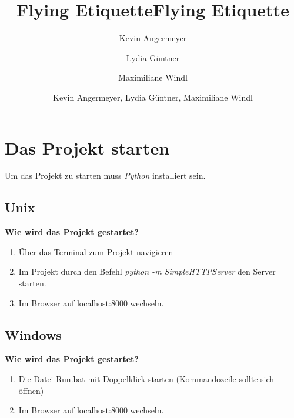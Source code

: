 \documentclass{mi-seminar}
\title{Flying Etiquette}
\author{Kevin Angermeyer \\ \and Lydia Güntner \\ \and Maximiliane Windl}
\title{Flying Etiquette}
\author{Kevin Angermeyer, Lydia Güntner, Maximiliane Windl}
\begin{document}
\maketitle
\newpage

\section{Das Projekt starten} \label{Das Projekt starten}
Um das Projekt zu starten muss \textit{Python} installiert sein.
\subsection{Unix}
\textbf{Wie wird das Projekt gestartet?}\newline
\begin{enumerate}
\item Über das Terminal zum Projekt navigieren
\item Im Projekt durch den Befehl \textit{python -m SimpleHTTPServer} den Server starten.
\item Im Browser auf localhost:8000 wechseln.
\end{enumerate}
\subsection{Windows}
\textbf{Wie wird das Projekt gestartet?}\newline
\begin{enumerate}
\item Die Datei Run.bat mit Doppelklick starten (Kommandozeile sollte sich öffnen)
\item Im Browser auf localhost:8000 wechseln.
\end{enumerate}
\end{document}
